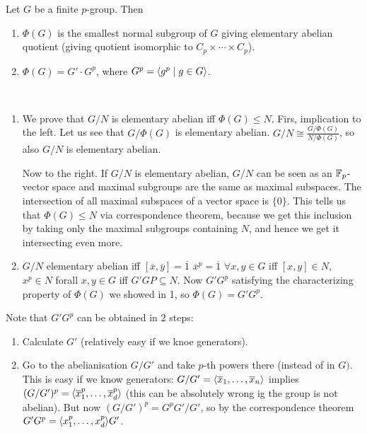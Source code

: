 \documentclass[twoside, 11pt]{article}
\begin{document}
\begin{teorema}
Let $G$ be a finite $p$-group. Then
\begin{enumerate}
\item $\Phi(G)$ is the smallest normal subgroup of $G$ giving elementary abelian quotient (giving quotient isomorphic to $C_p\times\cdots\times C_p$).
\item $\Phi(G)=G'\cdot G^p$, where $G^p=\langle{g^p\mid g\in G}\rangle$. 
\end{enumerate}
\end{teorema}
 \begin{dem}\
 \begin{enumerate}
 \item We prove that $G/N$ is elementary abelian iff $\Phi(G)\leq N$. Firs, implication to the left. Let us see that $G/\Phi(G)$ is elementary abelian. $G/N\cong \frac{G/\Phi(G)}{N/\Phi(G)}$, so also $G/N$ is elementary abelian. 
 
 Now to the right. If $G/N$ is elementary abelian, $G/N$ can be seen as an $\mathbb{F}_p$-vector space and maximal subgroups are the same as maximal subspaces. The intersection of all maximal subspaces of a vector space is $\{0\}$. This tells us that $\Phi(G)\leq N$ via correspondence theorem, because we get this inclusion by taking only the maximal subgroups containing $N$, and hence we get it intersecting even more. 
 
 \item $G/N$ elementary abelian iff $[\overline{x},\overline{y}]=\overline{1}$ $\overline{x}^p=\overline{1}$ $\forall x,y\in G$ iff $[x,y]\in N$, $x^p\in N$ forall $x,y\in G$ iff $G'GP\subseteq N$. Now $G'G^p$ satisfying the characterizing property of $\Phi(G)$ we showed in 1, so $\Phi(G)=G'G^p$. 
 \end{enumerate}
 \end{dem}
 
 Note that $G'G^p$ can be obtained in 2 steps:
 \begin{enumerate}
 \item Calculate $G'$ (relatively easy if we knoe generators).
 \item Go to the abelianisation $G/G'$ and take $p$-th powers there (instead of in $G)$. This is easy if we know generators: $G/G'=\langle{\overline{x}_1,\dots, \overline{x}_n}\rangle$ implies $(G/G')^p=\langle{\overline{x}^p_1,\dots, \overline{x}_d^p}\rangle$ (this can be absolutely wrong ig the group is not abelian). But now $(G/G')^p=G^pG'/G'$, so by the correspondence theorem $G'G^p=\langle{x_1^p,\dots, x_d^p}\rangle G'$. 
 \end{enumerate}
 
\end{document}

